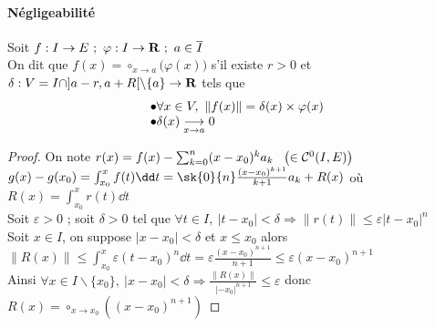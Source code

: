     \paragraph{Négligeabilité}
        Soit $f:I\rightarrow E ~;~\varphi : I\rightarrow {\mathbf{R}} ~;~a\in \overline{I}$ \\ On dit que \emph{$f(x) = \circ_{x\rightarrow a} 
        \big( \varphi (x) \big)$} s'il existe $r>0$ et $\delta : V=I\cap ]a-r,a+R[ \backslash\{a\} \rightarrow {\mathbf{R}}$ tels que \[ \begin{array}{l} \bullet 
        \forall x\in V ,~\|f(x)\| = \delta (x) \times \varphi (x) \\ \bullet \delta (x) \underset{x \to a}{\longrightarrow} 0 \end{array} \] \vspace*{-0.7cm}\trait
    \begin{proof}
    On note $r(x) = f(x) - \sum_{k=0}^n (x-x_0)^k a_k ~~\left(\in{\mathcal{C}}^0 (I,E) \right)$ \\ $g(x)-g(x_0) = \int_{x_0}^x f(t)\dd t = \sk{0}{n} 
    \frac{(x-x_0)^{k+1}}{k+1} a_k + R(x)$ où $R(x) = \int_{x_0}^x r(t) \dd t$\\
    Soit $\varepsilon >0$ ; soit $\delta >0$ tel que $\forall t\in I ,~|t-x_0| <\delta \Rightarrow \|r(t)\| \leq \varepsilon |t-x_0|^n$ \\
    Soit $x\in I$, on suppose $|x-x_0| <\delta$ et $x\leq x_0$ alors $\|R(x)\| \leq \int_{x_0}^x \varepsilon (t-x_0)^n \dd t = \varepsilon 
    \frac{(x-x_0)^{n+1}}{n+1} \leq \varepsilon (x-x_0)^{n+1}$ \\ Ainsi $\forall x\in I \backslash \{x_0\} ,~|x-x_0| <\delta \Rightarrow 
    \frac{ \|R(x)\|}{|-x_0|^{n+1}} \leq \varepsilon$ donc $R(x) = \circ_{x\rightarrow x_0} \left( (x-x_0)^{n+1} \right)$ 
    \end{proof}
